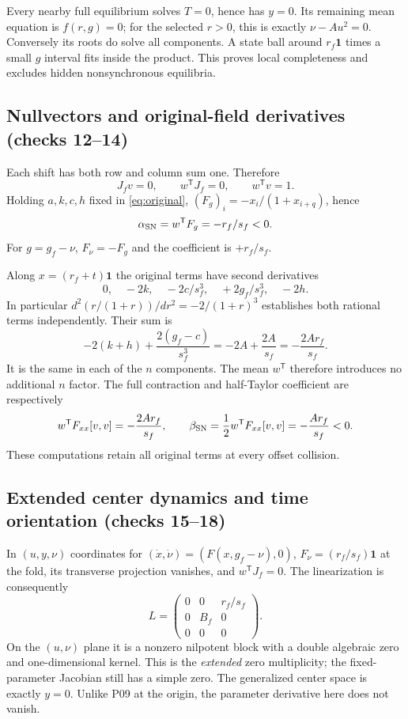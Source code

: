 \documentclass[11pt]{article}
\newcommand{\one}{\mathbf1}
\begin{document}
Every nearby full equilibrium solves $T=0$, hence has $y=0$. Its remaining
mean equation is $f(r,g)=0$; for the selected $r>0$, this is exactly
$\nu-Au^2=0$. Conversely its roots do solve all components. A state ball
around $r_f\one$ times a small $g$ interval fits inside the product. This
proves local completeness and excludes hidden nonsynchronous equilibria.

\subsection{Nullvectors and original-field derivatives (checks 12--14)}
Each shift has both row and column sum one. Therefore
\[
 J_fv=0,\qquad w^{\mathsf T}J_f=0,\qquad w^{\mathsf T}v=1.
\]
Holding $a,k,c,h$ fixed in \eqref{eq:original},
$(F_g)_i=-x_i/(1+x_{i+q})$, hence
\[
 \alpha_{\rm SN}=w^{\mathsf T}F_g=-r_f/s_f<0.
\]
For $g=g_f-\nu$, $F_\nu=-F_g$ and the coefficient is $+r_f/s_f$.

Along $x=(r_f+t)\one$ the original terms have second derivatives
\[
 0,\quad-2k,\quad-2c/s_f^3,\quad+2g_f/s_f^3,\quad-2h.
\]
In particular $d^2(r/(1+r))/dr^2=-2/(1+r)^3$ establishes both rational
terms independently. Their sum is
\[
 -2(k+h)+\frac{2(g_f-c)}{s_f^3}
 =-2A+\frac{2A}{s_f}=-\frac{2Ar_f}{s_f}.
\]
It is the same in each of the $n$ components. The mean $w^{\mathsf T}$
therefore introduces no additional $n$ factor. The full contraction and
half-Taylor coefficient are respectively
\[
 w^{\mathsf T}F_{xx}[v,v]=-\frac{2Ar_f}{s_f},\qquad
 \beta_{\rm SN}=\frac12w^{\mathsf T}F_{xx}[v,v]
              =-\frac{Ar_f}{s_f}<0.
\]
These computations retain all original terms at every offset collision.

\subsection{Extended center dynamics and time orientation (checks 15--18)}
In $(u,y,\nu)$ coordinates for $(\dot x,\dot\nu)=(F(x,g_f-\nu),0)$,
$F_\nu=(r_f/s_f)\one$ at the fold, its transverse projection vanishes,
and $w^{\mathsf T}J_f=0$. The linearization is consequently
\[
 L=\begin{pmatrix}
 0&0&r_f/s_f\\
 0&B_f&0\\
 0&0&0
 \end{pmatrix}.
\]
On the $(u,\nu)$ plane it is a nonzero nilpotent block with a double
algebraic zero and one-dimensional kernel. This is the \emph{extended}
zero multiplicity; the fixed-parameter Jacobian still has a simple zero.
The generalized center space is exactly $y=0$. Unlike P09 at the origin,
the parameter derivative here does not vanish.
\end{document}
